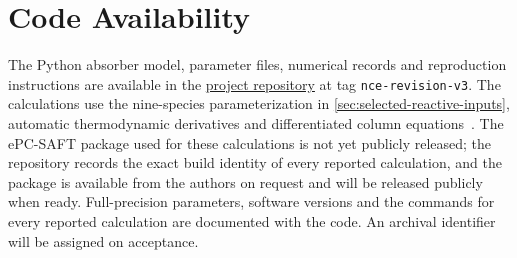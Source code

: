 \section*{Code Availability}
The Python absorber model, parameter files, numerical records and reproduction instructions are available in the \href{https://github.com/tannerpolley/MEA-Absorption-Column}{project repository} at tag \texttt{nce-revision-v3}.
The calculations use the nine-species parameterization in \cref{sec:selected-reactive-inputs}, automatic thermodynamic derivatives and differentiated column equations~\cite{Polley2026epcsaft}.
The ePC-SAFT package used for these calculations is not yet publicly released; the repository records the exact build identity of every reported calculation, and the package is available from the authors on request and will be released publicly when ready.
Full-precision parameters, software versions and the commands for every reported calculation are documented with the code.
An archival identifier will be assigned on acceptance.

